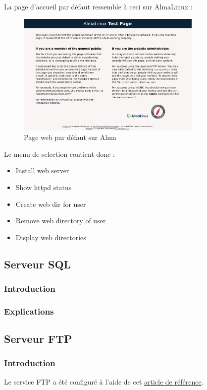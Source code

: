 \documentclass{article}
\begin{document}
	La page d'accueil par défaut ressemble à ceci sur AlmaLinux :
		\begin{figure}[h]
		\centering
		\includegraphics[width=0.8\textwidth]{webservdefault.png}
		 \caption{Page web par défaut sur Alma}
		\label{fig:your_label}
	\end{figure}
	
	Le menu de selection contient donc :
	\begin{itemize}
		\item Install web server
		\item Show httpd status
		\item Create web dir for user
		\item Remove web directory of user
		\item Display web directories
	\end{itemize}
	
	
	\newpage
	
	\subsection{Serveur SQL}
	\subsubsection{Introduction}
	\subsubsection{Explications}	

	\subsection{Serveur FTP}
	\subsubsection{Introduction}
	Le service FTP a été configuré à l'aide de cet \href{https://doc.fedora-fr.org/wiki/Vsftpd_:_Installation_et_configuration}{\underline{article de référence}}.
\end{document}
